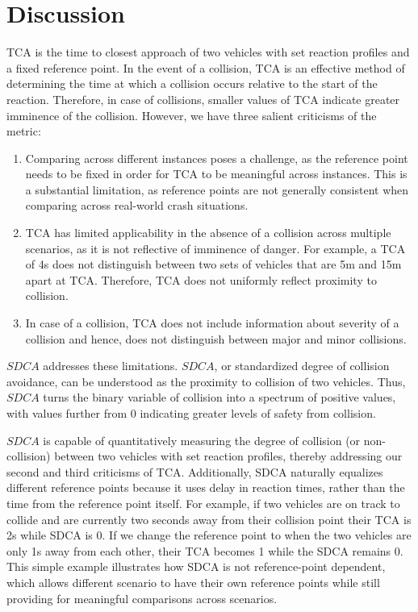 \documentclass{article}
\begin{document}
\section{Discussion}

TCA is the time to closest approach of two vehicles with set reaction profiles and a fixed reference point. In the event of a collision, TCA is an effective method of determining the time at which a collision occurs relative to the start of the reaction. Therefore, in case of collisions, smaller values of TCA indicate greater imminence of the collision. However, we have three salient criticisms of the metric:
\begin{enumerate}
    \item Comparing across different instances poses a challenge, as the reference point needs to be fixed in order for TCA to be meaningful across instances. This is a substantial limitation, as reference points are not generally consistent when comparing across real-world crash situations.
    \item TCA has limited applicability in the absence of a collision across multiple scenarios, as it is not reflective of imminence of danger. For example, a TCA of 4s does not distinguish between two sets of vehicles that are 5m and 15m apart at TCA. Therefore, TCA does not uniformly reflect proximity to collision.
    \item In case of a collision, TCA does not include information about severity of a collision and hence, does not distinguish between major and minor collisions.
\end{enumerate}
$SDCA$ addresses these limitations. $SDCA$, or standardized degree of collision avoidance, can be understood as the proximity to collision of two vehicles. Thus, $SDCA$ turns the binary variable of collision into a spectrum of positive values, with values further from 0 indicating greater levels of safety from collision.

$SDCA$ is capable of quantitatively measuring the degree of collision (or non-collision) between two vehicles with set reaction profiles, thereby addressing our second and third criticisms of TCA. Additionally, SDCA naturally equalizes different reference points because it uses delay in reaction times, rather than the time from the reference point itself. For example, if two vehicles are on track to collide and are currently two seconds away from their collision point their TCA is 2s while SDCA is 0. If we change the reference point to when the two vehicles are only 1s away from each other, their TCA becomes 1 while the SDCA remains 0. This simple example illustrates how SDCA is not reference-point dependent, which allows different scenario to have their own reference points while still providing for meaningful comparisons across scenarios.
\end{document}
